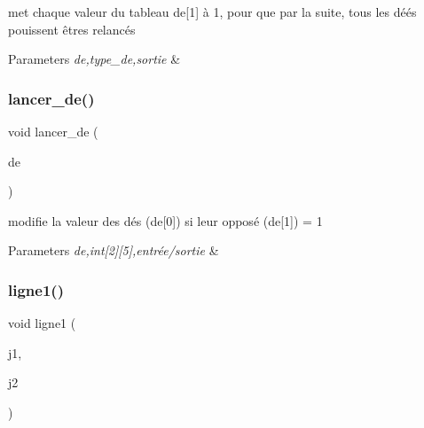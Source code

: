 met chaque valeur du tableau de\mbox{[}1\mbox{]} à 1, pour que par la suite, tous les déés pouissent êtres relancés 


\begin{DoxyParams}{Parameters}
{\em de,type\+\_\+de,sortie} & \\
\hline
\end{DoxyParams}
\mbox{\label{yams___cleo___martin-_colleu__2_80_8c_a8da1d298788f0d42c2755d2aef014b6f}} 
\subsubsection{\texorpdfstring{lancer\+\_\+de()}{lancer\_de()}}
{\footnotesize\ttfamily void lancer\+\_\+de (\begin{DoxyParamCaption}\item[{type\+\_\+de}]{de }\end{DoxyParamCaption})}



modifie la valeur des dés (de\mbox{[}0\mbox{]}) si leur opposé (de\mbox{[}1\mbox{]}) = 1 


\begin{DoxyParams}{Parameters}
{\em de,int\mbox{[}2\mbox{]}\mbox{[}5\mbox{]},entrée/sortie} & \\
\hline
\end{DoxyParams}
\mbox{\label{yams___cleo___martin-_colleu__2_80_8c_ae8b366432ca1376ab9fd71104cf988e4}} 
\subsubsection{\texorpdfstring{ligne1()}{ligne1()}}
{\footnotesize\ttfamily void ligne1 (\begin{DoxyParamCaption}\item[{nom}]{j1,  }\item[{nom}]{j2 }\end{DoxyParamCaption})}



